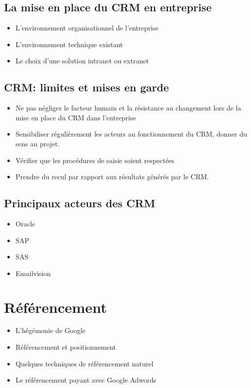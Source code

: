 \documentclass[12pt,a4paper,openany]{report}
\begin{document}
	\section{La mise en place du CRM en entreprise}
	\begin{itemize}
		\item L'environnement organisationnel de l'entreprise
		\item L'environnement technique existant
		\item Le choix d'une solution intranet ou extranet
	\end{itemize}
	\section{CRM: limites et mises en garde}
	\begin{itemize}
		\item Ne pas négliger le facteur humain et la résistance au changement lors de la mise en 
			place du CRM dans l'entreprise
		\item Sensibiliser régulièrement les acteurs au fonctionnement du CRM, donner du sens au 
			projet. 
		\item Vérifier que les procédures de saisie soient respectées
		\item Prendre du recul par rapport aux résultats générés par le CRM.
	\end{itemize}
	\section{Principaux acteurs des CRM}
	\begin{itemize}
		\item Oracle
		\item SAP
		\item SAS
		\item Emailvision
	\end{itemize}
	\chapter{Référencement}
	\begin{itemize}
		\item L'hégémonie de Google
		\item Référencement et positionnement
		\item Quelques techniques de référencement naturel
		\item Le référencement payant avec Google Adwords
	\end{itemize}
\end{document}
